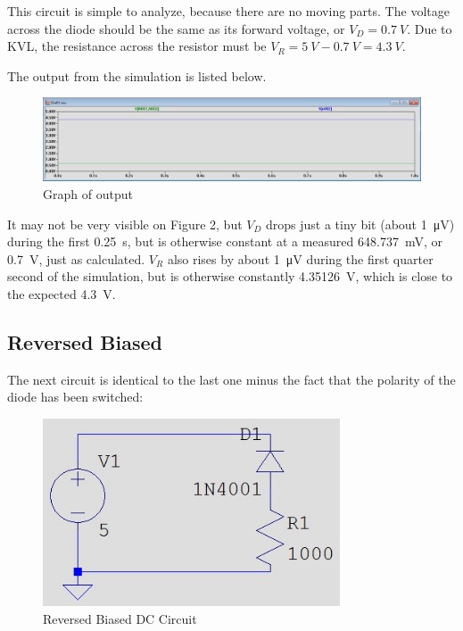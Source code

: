 \documentclass{article}
\begin{document}
This circuit is simple to analyze, because there are no
moving parts. The voltage across the diode should be
the same as its forward voltage, or \(V_D = \SI{0.7}{V}\).
Due to KVL, the resistance across the resistor must be
\(V_R = \SI{5}{V} - \SI{0.7}{V} = \SI{4.3}{V}\).

The output from the simulation is listed below.

\begin{figure}[h]
    \centering
    \includegraphics[width=\textwidth]{Images/5VForward.jpg}
    \caption{Graph of output}    
\end{figure}

It may not be very visible on Figure 2, but \(V_D\) drops
just a tiny bit (about \SI{1}{\micro V}) during the first
\SI{0.25}{s}, but is otherwise constant at a measured
\SI{648.737}{mV}, or \SI{0.7}{V}, just as calculated.
\(V_R\) also rises by about \SI{1}{\micro V} during the first
quarter second of the simulation, but is otherwise constantly
\SI{4.35126}{V}, which is close to the expected
\SI{4.3}{V}.

\subsection{Reversed Biased} The next circuit is identical
to the last one minus the fact that the polarity of the
diode has been switched: %

\begin{figure}[h]
    \centering
    \includegraphics[height=15em]{Images/Circuit1Reverse.jpg}
    \caption{Reversed Biased DC Circuit}
\end{figure}
\end{document}
